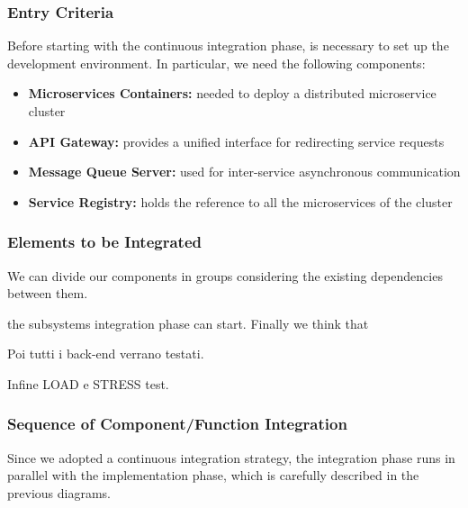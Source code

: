 \subsubsection{Entry Criteria}
Before starting with the continuous integration phase, is necessary to set up the development environment. In particular, we need the following components:

\begin{itemize}
    \item \textbf{Microservices Containers:} needed to deploy a distributed microservice cluster
    \item \textbf{API Gateway:} provides a unified interface for redirecting service requests
    \item \textbf{Message Queue Server:} used for inter-service asynchronous communication
    \item \textbf{Service Registry:} holds the reference to all the microservices of the cluster
\end{itemize}

\subsubsection{Elements to be Integrated}
We can divide our components in groups considering the existing dependencies between them.





the subsystems integration phase can start. Finally we think that

Poi tutti i back-end verrano testati.

Infine LOAD e STRESS test.

\subsubsection{Sequence of Component/Function Integration}
Since we adopted a continuous integration strategy, the integration phase runs in parallel  with the implementation phase, which is carefully described in the previous diagrams.
